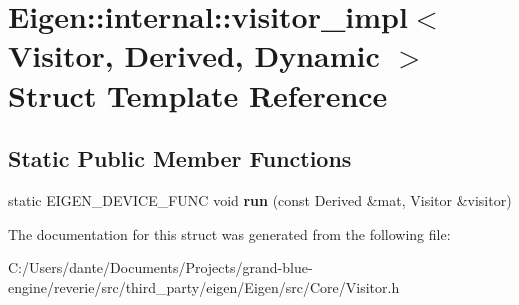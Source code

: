 \hypertarget{struct_eigen_1_1internal_1_1visitor__impl_3_01_visitor_00_01_derived_00_01_dynamic_01_4}{}\section{Eigen\+::internal\+::visitor\+\_\+impl$<$ Visitor, Derived, Dynamic $>$ Struct Template Reference}
\label{struct_eigen_1_1internal_1_1visitor__impl_3_01_visitor_00_01_derived_00_01_dynamic_01_4}
\subsection*{Static Public Member Functions}
\begin{DoxyCompactItemize}
\item 
\mbox{\label{struct_eigen_1_1internal_1_1visitor__impl_3_01_visitor_00_01_derived_00_01_dynamic_01_4_ad461f2734f94c0fd05dc0180b2724cc6}} 
static E\+I\+G\+E\+N\+\_\+\+D\+E\+V\+I\+C\+E\+\_\+\+F\+U\+NC void {\bfseries run} (const Derived \&mat, Visitor \&visitor)
\end{DoxyCompactItemize}


The documentation for this struct was generated from the following file\+:\begin{DoxyCompactItemize}
\item 
C\+:/\+Users/dante/\+Documents/\+Projects/grand-\/blue-\/engine/reverie/src/third\+\_\+party/eigen/\+Eigen/src/\+Core/Visitor.\+h\end{DoxyCompactItemize}
